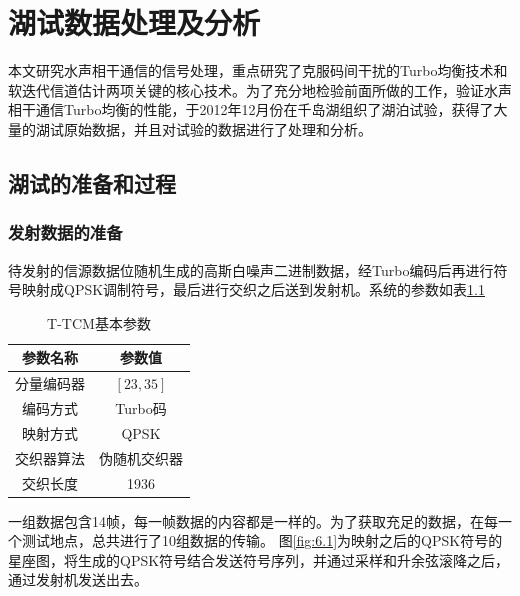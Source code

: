 %
\chapter{湖试数据处理及分析}
本文研究水声相干通信的信号处理，重点研究了克服码间干扰的Turbo均衡技术和软迭代信道估计两项关键的核心技术。为了充分地检验前面所做的工作，验证水声相干通信Turbo均衡的性能，于2012年12月份在千岛湖组织了湖泊试验，获得了大量的湖试原始数据，并且对试验的数据进行了处理和分析。


\section{湖试的准备和过程}
\subsection{发射数据的准备}
待发射的信源数据位随机生成的高斯白噪声二进制数据，经Turbo编码后再进行符号映射成QPSK调制符号，最后进行交织之后送到发射机。系统的参数如表\ref{tab:6.1}
\begin{table}[hbt]
  \centering
  \caption{T-TCM基本参数}
  \label{tab:6.1}
  \begin{threeparttable}
  \begin{tabular}{cc}
    \hline
    参数名称&参数值\\
    \hline
    分量编码器&$[23,35]$\\
    编码方式&Turbo码\\
    映射方式&QPSK\\
    交织器算法&伪随机交织器\\
    交织长度&1936\\
   \hline
  \end{tabular}
\end{threeparttable}
\end{table}
一组数据包含14帧，每一帧数据的内容都是一样的。为了获取充足的数据，在每一个测试地点，总共进行了10组数据的传输。
图\ref{fig:6.1}为映射之后的QPSK符号的星座图，将生成的QPSK符号结合发送符号序列，并通过采样和升余弦滚降之后，通过发射机发送出去。
